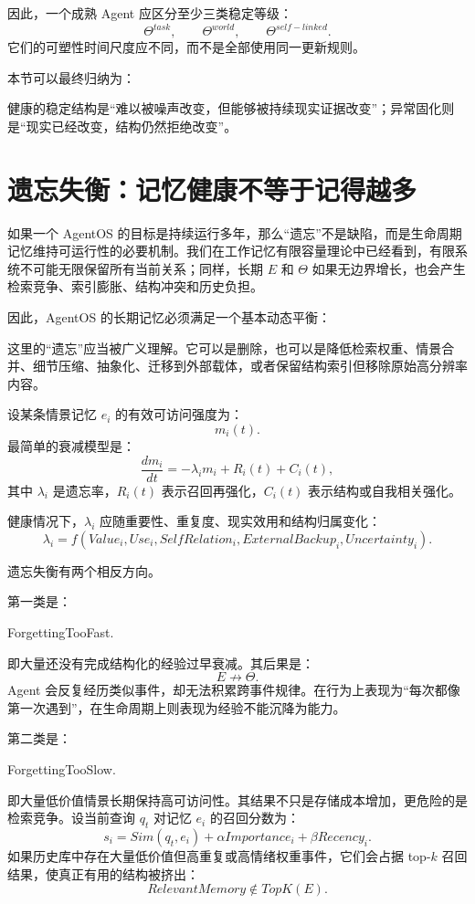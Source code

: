 因此，一个成熟 Agent 应区分至少三类稳定等级：
\[
\Theta^{task},
\qquad
\Theta^{world},
\qquad
\Theta^{self-linked}.
\]
它们的可塑性时间尺度应不同，而不是全部使用同一更新规则。

本节可以最终归纳为：
\begin{statementbox}
健康的稳定结构是“难以被噪声改变，但能够被持续现实证据改变”；异常固化则是“现实已经改变，结构仍然拒绝改变”。
\end{statementbox}

\section{遗忘失衡：记忆健康不等于记得越多}
\label{sec:forgetting-imbalance}

如果一个 AgentOS 的目标是持续运行多年，那么“遗忘”不是缺陷，而是生命周期记忆维持可运行性的必要机制。我们在工作记忆有限容量理论中已经看到，有限系统不可能无限保留所有当前关系；同样，长期 $E$ 和 $\Theta$ 如果无边界增长，也会产生检索竞争、索引膨胀、结构冲突和历史负担。

因此，AgentOS 的长期记忆必须满足一个基本动态平衡：
\begin{statementbox}
\centering
{}
\end{statementbox}

这里的“遗忘”应当被广义理解。它可以是删除，也可以是降低检索权重、情景合并、细节压缩、抽象化、迁移到外部载体，或者保留结构索引但移除原始高分辨率内容。

设某条情景记忆 $e_i$ 的有效可访问强度为：
\[
m_i(t).
\]
最简单的衰减模型是：
\[
\frac{dm_i}{dt}
=
-\lambda_i m_i
+
R_i(t)
+
C_i(t),
\]
其中 $\lambda_i$ 是遗忘率，$R_i(t)$ 表示召回再强化，$C_i(t)$ 表示结构或自我相关强化。

健康情况下，$\lambda_i$ 应随重要性、重复度、现实效用和结构归属变化：
\[
\lambda_i
=
f(
Value_i,
Use_i,
SelfRelation_i,
ExternalBackup_i,
Uncertainty_i
).
\]

遗忘失衡有两个相反方向。

第一类是：
\begin{statementbox}
ForgettingTooFast.
\end{statementbox}
即大量还没有完成结构化的经验过早衰减。其后果是：
\[
E\not\rightarrow\Theta.
\]
Agent 会反复经历类似事件，却无法积累跨事件规律。在行为上表现为“每次都像第一次遇到”，在生命周期上则表现为经验不能沉降为能力。

第二类是：
\begin{statementbox}
ForgettingTooSlow.
\end{statementbox}
即大量低价值情景长期保持高可访问性。其结果不只是存储成本增加，更危险的是检索竞争。设当前查询 $q_t$ 对记忆 $e_i$ 的召回分数为：
\[
s_i
=
Sim(q_t,e_i)
+
\alpha Importance_i
+
\beta Recency_i.
\]
如果历史库中存在大量低价值但高重复或高情绪权重事件，它们会占据 top-$k$ 召回结果，使真正有用的结构被挤出：
\[
RelevantMemory
\notin
TopK(E).
\]

